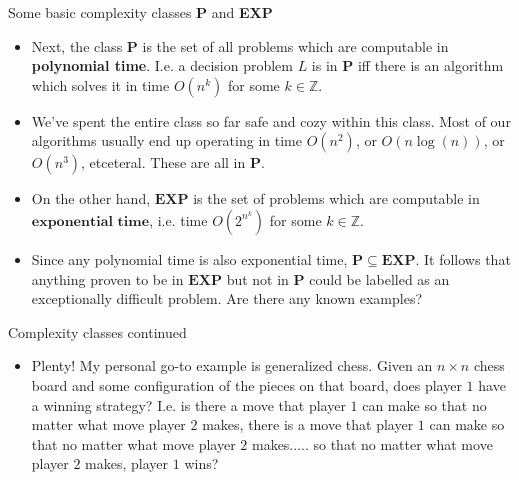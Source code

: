 \documentclass{beamer}
\begin{document}
\begin{frame}{Some basic complexity classes \textbf{P} and \textbf{EXP}}
    \begin{itemize}
        \item Next, the class $\mathbf{P}$ is the set of all problems which are computable in \textbf{polynomial time}. I.e. a decision problem $L$ is in $\mathbf{P}$ iff there is an algorithm which solves it in time $O(n^k)$ for some $k \in \mathbb{Z}$. 
        \item We've spent the entire class so far safe and cozy within this class. Most of our algorithms usually end up operating in time $O(n^2)$, or $O(n\log(n))$, or $O(n^3)$, etceteral. These are all in $\mathbf{P}$. 
        \item On the other hand, $\mathbf{EXP}$ is the set of problems which are computable in $\textbf{exponential time}$, i.e. time $O(2^{n^k})$ for some $k \in \mathbb{Z}$. 
        \item Since any polynomial time is also exponential time, $\mathbf{P} \subseteq \mathbf{EXP}$. It follows that anything proven to be in $\mathbf{EXP}$ but not in $\mathbf{P}$ could be labelled as an exceptionally difficult problem. Are there any known examples?
    \end{itemize}
\end{frame}

\begin{frame}{Complexity classes continued}
    \begin{itemize}
        \item Plenty! My personal go-to example is generalized chess. Given an $n \times n$ chess board and some configuration of the pieces on that board, does player $1$ have a winning strategy? I.e. is there a move that player $1$ can make so that no matter what move player $2$ makes, there is a move that player $1$ can make so that no matter what move player $2$ makes..... so that no matter what move player $2$ makes, player $1$ wins?
    \end{itemize}
\end{frame}
\end{document}
